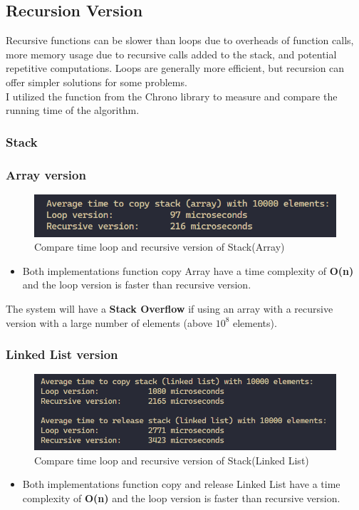 \subsection{Recursion Version}
Recursive functions can be slower than loops due to overheads of function calls, more memory usage due to recursive calls added to the stack, and potential repetitive computations. Loops are generally more efficient, but recursion can offer simpler solutions for some problems.\\
I utilized the function from the Chrono library to measure and compare the running time of the algorithm. \cite{Measure_time_in_C++}

\subsubsection{Stack}
\subsubsection*{Array version}
\begin{figure}[H]
    \centering
    \includegraphics[width=13cm]{img/img16.PNG}
    \caption{Compare time loop and recursive version of Stack(Array)}
    \label{fig:StackArrayCompare}
\end{figure}
\begin{itemize}
    \item  Both implementations function copy Array have a time complexity of \textbf{O(n)} and the loop version is faster than recursive version.
\end{itemize}
The system will have a \textbf{Stack Overflow} if using an array with a recursive version with a large number of elements (above $10^{8}$ elements).

\subsubsection*{Linked List version}
\begin{figure}[H]
    \centering
    \includegraphics[width=13cm]{img/img17.PNG}
    \caption{Compare time loop and recursive version of Stack(Linked List)}
    \label{fig:StackLinkedListCompare}
\end{figure}
\begin{itemize}
    \item  Both implementations function copy and release Linked List have a time complexity of \textbf{O(n)} and the loop version is faster than recursive version.
\end{itemize}

